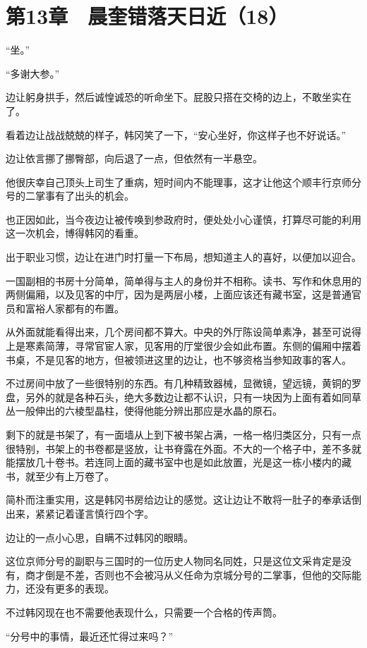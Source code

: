 \section{第13章　晨奎错落天日近（18）}

“坐。”

“多谢大参。”

边让躬身拱手，然后诚惶诚恐的听命坐下。屁股只搭在交椅的边上，不敢坐实在了。

看着边让战战兢兢的样子，韩冈笑了一下，“安心坐好，你这样子也不好说话。”

边让依言挪了挪臀部，向后退了一点，但依然有一半悬空。

他很庆幸自己顶头上司生了重病，短时间内不能理事，这才让他这个顺丰行京师分号的二掌事有了出头的机会。

也正因如此，当今夜边让被传唤到参政府时，便处处小心谨慎，打算尽可能的利用这一次机会，博得韩冈的看重。

出于职业习惯，边让在进门时打量一下布局，想知道主人的喜好，以便加以迎合。

一国副相的书房十分简单，简单得与主人的身份并不相称。读书、写作和休息用的两侧偏厢，以及见客的中厅，因为是两层小楼，上面应该还有藏书室，这是普通官员和富裕人家都有的布置。

从外面就能看得出来，几个房间都不算大。中央的外厅陈设简单素净，甚至可说得上是寒素简薄，寻常官宦人家，见客用的厅堂很少会如此布置。东侧的偏厢中摆着书桌，不是见客的地方，但被领进这里的边让，也不够资格当参知政事的客人。

不过房间中放了一些很特别的东西。有几种精致器械，显微镜，望远镜，黄铜的罗盘，另外的就是各种石头，绝大多数边让都不认识，只有一块因为上面有着如同草丛一般伸出的六棱型晶柱，使得他能分辨出那应是水晶的原石。

剩下的就是书架了，有一面墙从上到下被书架占满，一格一格归类区分，只有一点很特别，书架上的书卷都是竖放，让书脊露在外面。不大的一个格子中，差不多就能摆放几十卷书。若连同上面的藏书室中也是如此放置，光是这一栋小楼内的藏书，就至少有上万卷了。

简朴而注重实用，这是韩冈书房给边让的感觉。这让边让不敢将一肚子的奉承话倒出来，紧紧记着谨言慎行四个字。

边让的一点小心思，自瞒不过韩冈的眼睛。

这位京师分号的副职与三国时的一位历史人物同名同姓，只是这位文采肯定是没有，商才倒是不差，否则也不会被冯从义任命为京城分号的二掌事，但他的交际能力，还没有更多的表现。

不过韩冈现在也不需要他表现什么，只需要一个合格的传声筒。

“分号中的事情，最近还忙得过来吗？”

